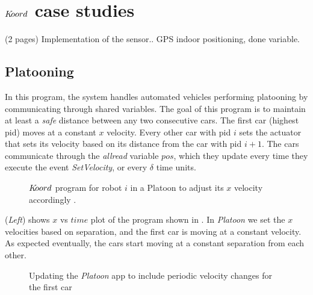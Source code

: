 \section{$K\kern-2pt oord$ case studies}

(2 pages)
Implementation of the sensor.. GPS indoor positioning, done variable. 
%

\subsection{Platooning}
\label{sec:platooning}
In this program, the system handles automated vehicles performing platooning by communicating through shared variables. The goal of this program is to maintain at least a \emph{safe} distance between any two consecutive cars. The first car (highest pid) moves at a constant $x$ velocity. Every other car with pid $i$ sets the actuator that sets its velocity based on its distance from the car with pid $i+1$. The cars communicate through the \emph{allread} variable $\mathit{pos}$, which they update every time they execute the event \emph{SetVelocity}, or every $\delta$ time units.

\begin{figure}[ht!]
    \noindent
    \begin{center}
        \scriptsize
        {}
        {}
    \end{center}
    \caption{$K\kern-2pt oord$ program for robot $i$ in a Platoon to adjust its $x$ velocity accordingly .}
    \label{fig:platooningapp}
\end{figure}


 (\emph{Left}) shows $x$ vs $\mathit{time}$ plot of the program shown in . In \emph{Platoon} we set the $x$ velocities based on separation, and the first car is moving at a constant velocity. As expected eventually, the cars start moving at a constant separation from each other. 
\begin{figure}[ht!]
    \noindent
    \begin{center}
        \scriptsize
        {}
        {}
    \end{center}
    \caption{ Updating the \emph{Platoon} app to include periodic velocity changes for the first car}
    \label{fig:platooningapp2}
\end{figure}

